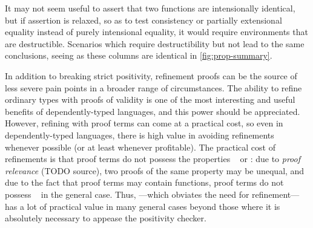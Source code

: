 It may not seem useful to assert that two functions are intensionally identical, but if assertion is relaxed,
so as to test consistency or partially extensional equality instead of purely intensional equality,
it would require environments that are destructible.
Scenarios which require destructibility but not \EqDec{} lead to the same conclusions,
seeing as these columns are identical in \autoref{fig:prop-summary}.

In addition to breaking strict positivity, refinement proofs can be the source of less severe pain points in
a broader range of circumstances.
The ability to refine ordinary types with proofs of validity is one of the most interesting and useful benefits of
dependently-typed languages, and this power should be appreciated. However, refining with proof terms can
come at a practical cost, so even in dependently-typed languages, there is high value in avoiding refinements
whenever possible (or at least whenever profitable). The practical cost of refinements is that proof terms
do not possess the properties \SemInj~ or \EqDec: due to \emph{proof relevance} (TODO source), two proofs of
the same property may be unequal, and due to the fact that proof terms may contain functions, proof terms do not
possess \EqDec~ in the general case. Thus, \SemTot---which obviates the need for refinement---has
a lot of practical value in many general cases beyond those where it is absolutely necessary to appease the
positivity checker.
